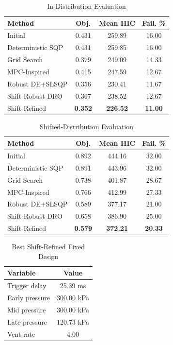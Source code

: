 \documentclass[conference]{IEEEtran}
\begin{document}
\begin{table}[!t]
\caption{In-Distribution Evaluation}
\label{tab:iid}
\centering
\begin{tabular}{lccc}
\toprule
Method & Obj. & Mean HIC & Fail. \%\\
\midrule
Initial & 0.431 & 259.89 & 16.00\\
Deterministic SQP & 0.431 & 259.85 & 16.00\\
Grid Search & 0.379 & 249.09 & 14.33\\
MPC-Inspired & 0.415 & 247.59 & 12.67\\
Robust DE+SLSQP & 0.356 & 230.41 & 11.67\\
Shift-Robust DRO & 0.367 & 238.52 & 12.67\\
Shift-Refined & \textbf{0.352} & \textbf{226.52} & \textbf{11.00}\\
\bottomrule
\end{tabular}
\end{table}

\begin{table}[!t]
\caption{Shifted-Distribution Evaluation}
\label{tab:shifted}
\centering
\begin{tabular}{lccc}
\toprule
Method & Obj. & Mean HIC & Fail. \%\\
\midrule
Initial & 0.892 & 444.16 & 32.00\\
Deterministic SQP & 0.891 & 443.96 & 32.00\\
Grid Search & 0.738 & 401.87 & 28.67\\
MPC-Inspired & 0.766 & 412.99 & 27.33\\
Robust DE+SLSQP & 0.589 & 377.17 & 21.00\\
Shift-Robust DRO & 0.658 & 386.90 & 25.00\\
Shift-Refined & \textbf{0.579} & \textbf{372.21} & \textbf{20.33}\\
\bottomrule
\end{tabular}
\end{table}

\begin{table}[!t]
\caption{Best Shift-Refined Fixed Design}
\label{tab:design}
\centering
\begin{tabular}{lc}
\toprule
Variable & Value\\
\midrule
Trigger delay & 25.39 ms\\
Early pressure & 300.00 kPa\\
Mid pressure & 300.00 kPa\\
Late pressure & 120.73 kPa\\
Vent rate & 4.00\\
\bottomrule
\end{tabular}
\end{table}
\end{document}
